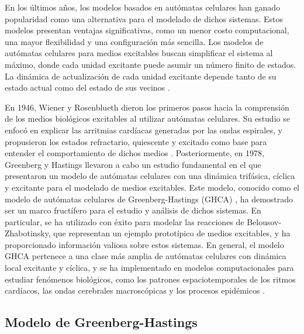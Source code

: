 En los últimos años, los modelos basados en autómatas celulares han ganado popularidad como una alternativa para el modelado de dichos sistemas. Estos modelos presentan ventajas significativas, como un menor costo computacional, una mayor flexibilidad y una configuración más sencilla. Los modelos de autómatas celulares para medios excitables buscan simplificar el sistema al máximo, donde cada unidad excitante puede asumir un número finito de estados. La dinámica de actualización de cada unidad excitante depende tanto de su estado actual como del estado de sus vecinos \cite{sinha_patterns_2019}.



En 1946, Wiener y Rosenblueth dieron los primeros pasos hacia la comprensión de los medios biológicos excitables al utilizar autómatas celulares. Su estudio se enfocó en explicar las arritmias cardíacas generadas por las ondas espirales, y propusieron los estados refractario, quiescente y excitado como base para entender el comportamiento de dichos medios \cite{wiener_mathematical_1946}.  Posteriormente, en 1978, Greenberg y Hastings llevaron a cabo un estudio fundamental en el que presentaron un modelo de autómatas celulares con una dinámica trifásica, cíclica y excitante para el modelado de medios excitables. Este modelo, conocido como el modelo de autómatas celulares de Greenberg-Hastings (GHCA) \cite{greenberg_spatial_1978}, ha demostrado ser un marco fructífero para el estudio y análisis de dichos sistemas. En particular, se ha utilizado con éxito para modelar las reacciones de Belousov-Zhabotinsky, que representan un ejemplo prototípico de medios excitables, y ha proporcionado información valiosa sobre estos sistemas. En general, el modelo GHCA pertenece a una clase más amplia de autómatas celulares con dinámica local excitante y cíclica, y se ha implementado en modelos computacionales para estudiar fenómenos biológicos, como los patrones espaciotemporales de los ritmos cardíacos, las ondas cerebrales macroscópicas y los procesos epidémicos  \cite{hadeler_cellular_2017}.



\subsection{Modelo  de Greenberg-Hastings}\label{sec:modeloGH}


